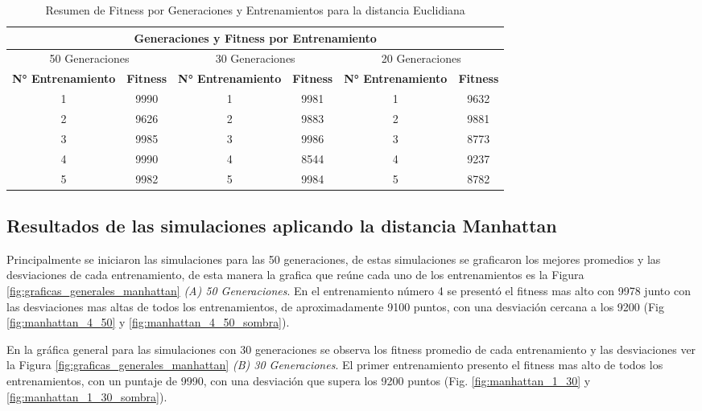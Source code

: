 \documentclass[conference]{IEEEtran}
\begin{document}
\begin{table}[ht]
    \centering
    \caption{Resumen de Fitness por Generaciones y Entrenamientos para la distancia Euclidiana}
    \label{tab:fitness_generaciones}
    \begin{tabular}{cccccc}
        \toprule
        \multicolumn{6}{c}{Generaciones y Fitness por Entrenamiento} \\
        \midrule
        \multicolumn{2}{c}{50 Generaciones} & \multicolumn{2}{c}{30 Generaciones} & \multicolumn{2}{c}{20 Generaciones} \\
        \cmidrule(lr){1-2} \cmidrule(lr){3-4} \cmidrule(lr){5-6}
        \textbf{N° Entrenamiento} & \textbf{Fitness} & \textbf{N° Entrenamiento} & \textbf{Fitness} & \textbf{N° Entrenamiento} & \textbf{Fitness} \\
        \midrule
        1 & 9990 & 1 & 9981 & 1 & 9632 \\
        2 & 9626 & 2 & 9883 & 2 & 9881 \\
        3 & 9985 & 3 & 9986 & 3 & 8773 \\
        4 & 9990 & 4 & 8544 & 4 & 9237 \\
        5 & 9982 & 5 & 9984 & 5 & 8782 \\
        \bottomrule
    \end{tabular}
\end{table}

\subsection{Resultados de las simulaciones aplicando la distancia Manhattan}
Principalmente se iniciaron las simulaciones para las 50 generaciones, de estas simulaciones se graficaron los mejores promedios y las desviaciones de cada entrenamiento, de esta manera la grafica que reúne cada uno de los entrenamientos es la Figura \ref{fig:graficas_generales_manhattan} \textit{(A) 50 Generaciones}.
En el entrenamiento número 4 se presentó el fitness mas alto con 9978 junto con las desviaciones mas altas de todos los entrenamientos, de aproximadamente 9100 puntos, con una desviación cercana a los 9200 (Fig \ref{fig:manhattan_4_50} y \ref{fig:manhattan_4_50_sombra}).

En la gráfica general para las simulaciones con 30 generaciones se observa los fitness promedio de cada entrenamiento y las desviaciones ver la Figura \ref{fig:graficas_generales_manhattan} \textit{(B) 30 Generaciones}.
El primer entrenamiento presento el fitness mas alto de todos los entrenamientos, con un puntaje de 9990, con una desviación que supera los 9200 puntos (Fig. \ref{fig:manhattan_1_30} y \ref{fig:manhattan_1_30_sombra}).
\end{document}

